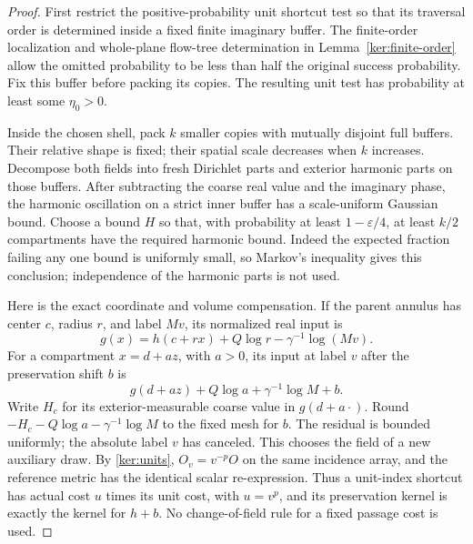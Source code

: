\documentclass[11pt]{article}
\numberwithin{equation}{section}
\theoremstyle{definition}
\theoremstyle{remark}
\newcommand{\1}{\mathbf 1}
\begin{document}
\begin{proof}
First restrict the positive-probability unit shortcut test so that its
traversal order is determined inside a fixed finite imaginary buffer.
The finite-order localization and whole-plane flow-tree determination
in Lemma~\ref{ker:finite-order} allow the omitted probability to be
less than half the original success probability.  Fix this buffer
before packing its copies.  The resulting unit test has probability
at least some $\eta_0>0$.

Inside the chosen shell, pack $k$ smaller copies with mutually
disjoint full buffers.  Their relative shape is fixed; their spatial
scale decreases when $k$ increases.  Decompose both fields into fresh
Dirichlet parts and exterior harmonic parts on those buffers.  After
subtracting the coarse real value and the imaginary phase, the
harmonic oscillation on a strict inner buffer has a scale-uniform
Gaussian bound.  Choose a bound $H$ so that, with probability at least
$1-\varepsilon/4$, at least $k/2$ compartments have the required
harmonic bound.  Indeed the expected fraction failing any one bound
is uniformly small, so Markov's inequality gives this conclusion;
independence of the harmonic parts is not used.

Here is the exact coordinate and volume compensation.  If the parent
annulus has center $c$, radius $r$, and label $Mv$, its normalized
real input is
\[
 g(x)=h(c+rx)+Q\log r-\gamma^{-1}\log(Mv).
\]
For a compartment $x=d+az$, with $a>0$, its input at label $v$
after the preservation shift $b$ is
\begin{equation}\label{met:compartment-input}
 g(d+az)+Q\log a+\gamma^{-1}\log M+b.
\end{equation}
Write $H_c$ for its exterior-measurable coarse value in $g(d+a\cdot)$.
Round $-H_c-Q\log a-\gamma^{-1}\log M$ to the fixed mesh for $b$.
The residual is bounded uniformly; the absolute label $v$ has
canceled.  This chooses the field of a new auxiliary draw.
By \eqref{ker:units}, $O_v=v^{-p}O$ on the same incidence array,
and the reference metric has the identical scalar re-expression.
Thus a unit-index shortcut has actual cost $u$ times its unit cost,
with $u=v^p$, and its preservation kernel is exactly the kernel for
$h+b$.  No change-of-field rule for a fixed passage cost is used.


\end{proof}
\end{document}
